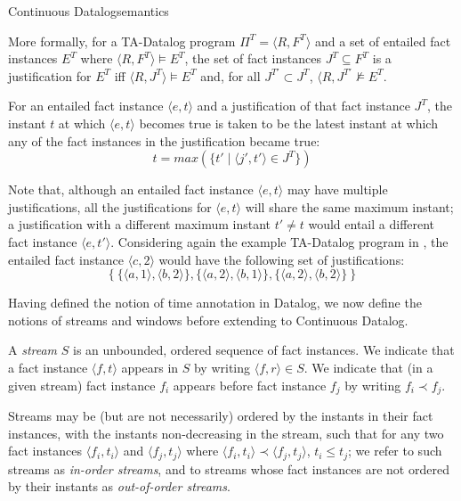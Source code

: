 \begin{nestedsection}{Continuous Datalog}{semantics}
\begin{definition}
More formally, for a TA-Datalog program $\Pi^T = \langle R, F^T \rangle$
and a set of entailed fact instances $E^T$ where $\langle R, F^T \rangle \models E^T$, the set of fact instances $J^T \subseteq F^T$ is a justification for
$E^T$ iff $\langle R, J^T \rangle \models E^T$ and, for all $J^{T\prime} \subset J^T$, $\langle R, J^{T\prime} \not\models E^T$.

For an entailed fact instance $\langle e, t\rangle$ and a
justification of that fact instance $J^T$, the instant $t$ at which
$\langle e, t \rangle$ becomes true is taken to be the latest instant
at which any of the fact instances in the justification became true:
\[ t = max(\{ t' \mid \langle j', t' \rangle \in J^T \}) \]

Note that, although an entailed fact instance $\langle e, t\rangle$
may have multiple justifications, all the justifications for $\langle
e, t \rangle$ will share the same maximum instant; a justification
with a different maximum instant $t' \neq t$ would entail a different
fact instance $\langle e, t' \rangle$. Considering again the example
TA-Datalog program in ,
the entailed fact instance $\langle c, 2 \rangle$ would have the
following set of justifications:
\[
  \{ \ \{ \langle a, 1 \rangle, \langle b, 2 \rangle \},  \{ \langle a, 2 \rangle, \langle b, 1 \rangle \},  \{ \langle a, 2 \rangle, \langle b, 2 \rangle \} \  \}
\]

\end{definition}

Having defined the notion of time annotation in Datalog, we now define
the notions of streams and windows before extending to Continuous Datalog.

\begin{definition}[Streams]

A {\em stream} $S$ is an unbounded, ordered sequence of fact
instances. We indicate that a fact instance $\langle f, t\rangle$
appears in $S$ by writing $\langle f, r \rangle \in S$. We indicate
that (in a given stream) fact instance $f_i$ appears before fact
instance $f_j$ by writing $f_i \prec f_j$.

Streams may be (but are not necessarily) ordered by the instants in
their fact instances, with the instants non-decreasing in the stream,
such that for any two fact instances $\langle f_i, t_i \rangle$ and
$\langle f_j, t_j\rangle$ where $\langle f_i, t_i \rangle \prec
\langle f_j, t_j \rangle$, $t_i \leqslant t_j$; we refer to such
streams as {\em in-order streams}, and to streams whose fact instances
are not ordered by their instants as {\em out-of-order streams}.
\end{definition}


\end{nestedsection}
